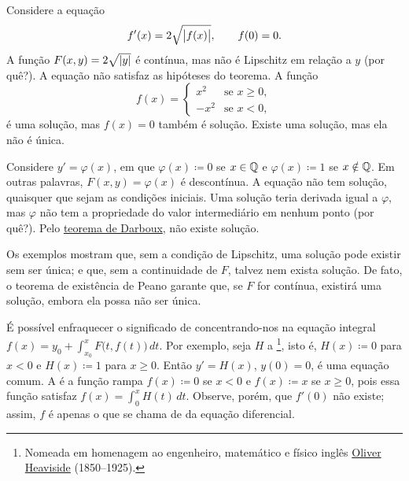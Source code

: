 \begin{example}
Considere a equação
\begin{equation*}
f'(x) = 2 \sqrt{\bigl\lvert {f(x)} \bigr\rvert}, \qquad f(0) = 0 .
\end{equation*}
A função $F(x,y) = 2 \sqrt{\lvert {y} \rvert}$ é contínua, mas não é Lipschitz
em relação a $y$ (por quê?). A equação não satisfaz as hipóteses do
teorema. A função
\begin{equation*}
f(x) =
\begin{cases}
x^2 & \text{se } x \geq 0,\\
-x^2 & \text{se } x < 0,
\end{cases}
\end{equation*}
é uma solução, mas $f(x)=0$ também é solução.
Existe uma solução, mas ela não é única.
\end{example}

\begin{example}
Considere $y' = \varphi(x)$, em que $\varphi(x) \coloneqq 0$ se $x \in {\mathbb{Q}}$
e $\varphi(x)\coloneqq 1$ se $x \notin {\mathbb{Q}}$. Em outras palavras,
$F(x,y) = \varphi(x)$ é descontínua.
A equação não tem solução, quaisquer que sejam as condições iniciais.
Uma solução teria derivada igual a $\varphi$, mas $\varphi$ não tem a
propriedade do valor intermediário em nenhum ponto (por quê?).
Pelo \hyperref[thm:darboux]{teorema de Darboux}, não existe solução.
\end{example}

Os exemplos mostram que, sem a condição de Lipschitz, uma solução pode
existir sem ser única; e que, sem a continuidade de $F$, talvez nem exista
solução.
De fato, o teorema de existência de Peano garante que, se $F$ for contínua,
existirá uma solução, embora ela possa não ser única.

\begin{remark}
É possível enfraquecer o significado de 
concentrando-nos na equação integral
$f(x) = y_0 + \int_{x_0}^x F\bigl(t,f(t)\bigr) \, dt$. Por exemplo,
seja $H$ a %
\footnote{Nomeada em homenagem ao engenheiro, matemático e físico inglês
\href{https://en.wikipedia.org/wiki/Oliver_Heaviside}{Oliver Heaviside}
(1850--1925).}, isto é, $H(x) \coloneqq 0$ para $x < 0$ e
$H(x) \coloneqq 1$ para $x \geq 0$.
Então
$y' = H(x)$, $y(0) = 0$,
é uma equação comum.
A  é a função rampa
$f(x) \coloneqq 0$ se $x < 0$ e $f(x) \coloneqq x$ se $x \geq 0$,
pois essa função satisfaz
$f(x) = \int_0^x H(t)\, dt$. Observe, porém, que $f'(0)$ não existe;
assim, $f$ é apenas o que se chama de \emph{} da
equação diferencial.
\end{remark}


